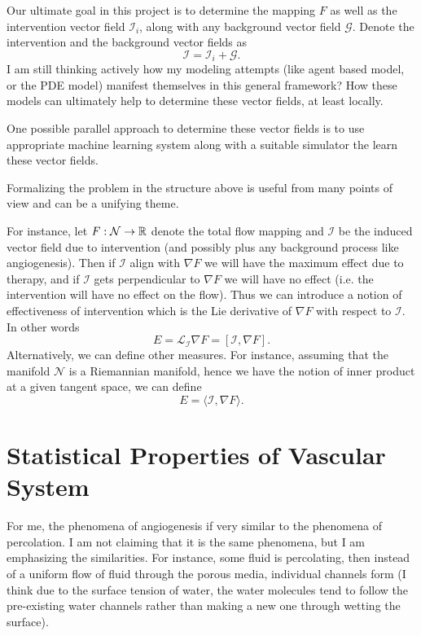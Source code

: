 \begin{openQuestion}
	Our ultimate goal in this project is to determine the mapping $ F $ as well as the intervention vector field $ \mathcal{I}_i $, along with any background vector field $ \mathcal{G} $. Denote the intervention and the background vector fields as 
	\[ \mathcal{I} = \mathcal{I}_i + \mathcal{G}. \]
	I am still thinking actively how my modeling attempts (like agent based model, or the PDE model) manifest themselves in this general framework? How these models can ultimately help to determine these vector fields, at least locally.
\end{openQuestion}


\begin{openQuestion}
	One possible parallel approach to determine these vector fields is to use appropriate machine learning system along with a suitable simulator the learn these vector fields.
\end{openQuestion}


\begin{observation}
	Formalizing the problem in the structure above is useful from many points of view and can be a unifying theme. 
	
	For instance, let $ F:\mathcal{N}\to \mathbb{R} $ denote the total flow mapping and $ \mathcal{I} $ be the induced vector field due to intervention (and possibly plus any background process like angiogenesis). Then if $ \mathcal{I} $ align with $ \nabla F $ we will have the maximum effect due to therapy, and if $ \mathcal{I} $ gets perpendicular to $ \nabla{F} $ we will have no effect (i.e. the intervention will have no effect on the flow). Thus we can introduce a notion of effectiveness of intervention which is the Lie derivative of $ \nabla F $ with respect to $ \mathcal{I} $. In other words
	\[ E = \mathcal{L}_{\mathcal{I}} \nabla F = [\mathcal{I},\nabla F]. \]
	Alternatively, we can define other measures. For instance, assuming that the manifold $ \mathcal{N} $ is a Riemannian manifold, hence we have the notion of inner product at a given tangent space, we can define
	\[ E = \langle \mathcal{I}, \nabla F \rangle . \]
\end{observation}






\section{Statistical Properties of Vascular System}
For me, the phenomena of angiogenesis if very similar to the phenomena of percolation. I am not claiming that it is the same phenomena, but I am emphasizing the similarities. For instance, some fluid is percolating, then instead of a uniform flow of fluid through the porous media, individual channels form (I think due to the surface tension of water, the water molecules tend to follow the pre-existing water channels rather than making a new one through wetting the surface).

